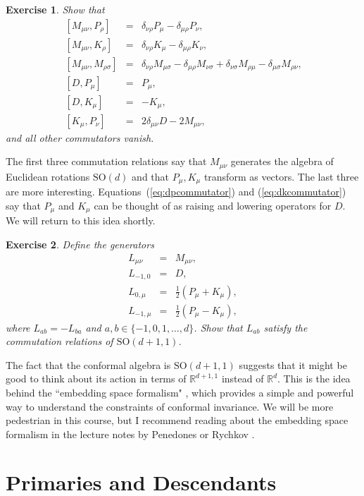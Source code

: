 \documentclass[11pt]{ws-rv9x6}
\newcommand\be{\begin{eqnarray}}
\newcommand\ee{\end{eqnarray}}
\newcommand\<\langle
\renewcommand\>\rangle
\newcommand\de\delta
\newcommand\R{\mathbb{R}}
\newcommand\nn{\nonumber}
\renewcommand\.{\cdot}
\newcommand\s\sigma
\newcommand\SO{\mathrm{SO}}
\newtheorem{exercise}{Exercise}[section]
\begin{document}
\begin{exercise} Show that
\be
\,[M_{\mu\nu},P_\rho] &=& \de_{\nu\rho}P_\mu - \de_{\mu\rho}P_\nu,\\
\,[M_{\mu\nu},K_\rho] &=& \de_{\nu\rho}K_\mu - \de_{\mu\rho}K_\nu,\\
\,[M_{\mu\nu},M_{\rho\s}] &=& \de_{\nu\rho}M_{\mu\s}-\de_{\mu\rho}M_{\nu\s}+\de_{\nu\s}M_{\rho\mu}-\de_{\mu\s}M_{\rho\nu},\label{eq:mmcommutator}\\
\label{eq:dpcommutator}
\,[D,P_\mu]&=&P_\mu,\\
\label{eq:dkcommutator}
\,[D,K_\mu]&=&-K_\mu,\\
\,[K_\mu,P_\nu]&=&2\de_{\mu\nu}D-2M_{\mu\nu},
\ee
and all other commutators vanish.
\end{exercise}
The first three commutation relations say that $M_{\mu\nu}$ generates the algebra of Euclidean rotations $\SO(d)$ and that $P_\mu,K_\mu$ transform as vectors.  The last three are more interesting.  Equations~(\ref{eq:dpcommutator}) and (\ref{eq:dkcommutator}) say that $P_\mu$ and $K_\mu$ can be thought of as raising and lowering operators for $D$. We will return to this idea shortly.

\begin{exercise} Define the generators
\be
\label{eq:conformalgeneratorssodplus11}
L_{\mu\nu}&=&M_{\mu\nu},\nn\\
L_{-1,0} &=& D,\nn\\
L_{0,\mu} &=& \frac 1 2 (P_\mu+K_\mu),\nn\\
L_{-1,\mu}&=& \frac 1 2 (P_\mu-K_\mu),
\ee
where $L_{ab}=-L_{ba}$ and $a,b\in \{-1,0,1,\dots,d\}$.  Show that $L_{ab}$ satisfy the commutation relations of $\SO(d+1,1)$.
\end{exercise}
The fact that the conformal algebra is $\SO(d+1,1)$ suggests that it might be good to think about its action in terms of $\R^{d+1,1}$ instead of $\R^d$.  This is the idea behind the ``embedding space formalism" \cite{Dirac:1936fq,Mack:1969rr,Boulware:1970ty,Ferrara:1973eg,Weinberg:2010fx,Costa:2011mg}, which provides a simple and powerful way to understand the constraints of conformal invariance. We will be more pedestrian in this course, but I recommend reading about the embedding space formalism in the lecture notes by Penedones \cite{Joao} or Rychkov \cite{Rychkov:2016iqz}.

\section{Primaries and Descendants}
\end{document}
